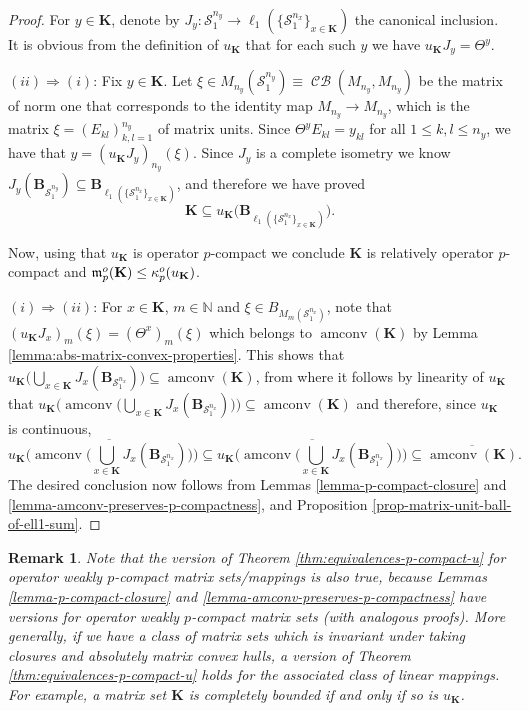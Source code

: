 \documentclass[11pt]{amsart}
\DeclareMathOperator{\CB}{\mathcal{CB}}
\DeclareMathOperator{\amconv}{amconv}
\newcommand{\N}{{\mathbb{N}}}
\newtheorem{remark}[theorem]{Remark}
\numberwithin{equation}{section}
\begin{document}
\begin{proof}
For $y\in \mathbf{K}$, denote by $J_y : \mathcal{S}_1^{n_y} \to \ell_1( \{ \mathcal{S}^{n_x}_1 \}_{x \in \mathbf{K}}) $ the canonical inclusion. It is obvious from the definition of $u_{\mathbf{K}}$ that for each such $y$ we have $u_{\mathbf{K}}J_y = \Theta^y$.

$(ii) \Rightarrow (i)$:
Fix $y\in \mathbf{K}$.
Let $\xi \in M_{n_y}(\mathcal{S}_1^{n_y}) \equiv \CB(M_{n_y},M_{n_y})$ be the matrix of norm one that corresponds to the identity map $M_{n_y} \to M_{n_y}$, which is the matrix $\xi = (E_{kl})_{k,l=1}^{n_y}$ of matrix units.
Since $\Theta^yE_{kl} = y_{kl}$ for all $1 \le k,l \le n_y$, we have that $y = (u_{\mathbf{K}}J_y)_{n_y}(\xi)$.
Since $J_y$ is a complete isometry we know $J_y(\mathbf{B}_{\mathcal{S}_1^{n_y}}) \subseteq \mathbf{B}_{\ell_1( \{ \mathcal{S}^{n_x}_1 \}_{x \in \mathbf{K}}) }$, and therefore we have proved
$$
\mathbf{K} \subseteq u_{\mathbf{K}}\big( \mathbf{B}_{\ell_1( \{ \mathcal{S}^{n_x}_1 \}_{x \in \mathbf{K}}) } \big).
$$

Now, using that $u_{\mathbf{K}}$ is operator $p$-compact we conclude $\mathbf{K}$ is relatively operator $p$-compact and $\frak m_p^o(\mathbf{K}) \le \kappa_p^o(u_\mathbf{K})$.

$(i) \Rightarrow (ii)$:
For $x\in \mathbf{K}$, $m\in\N$ and $\xi \in B_{M_m(\mathcal{S}_1^{n_x})}$, note that $(u_{\mathbf{K}}J_x)_m(\xi) = (\Theta^x)_m(\xi)$
which belongs to $\amconv(\mathbf{K})$ by Lemma \ref{lemma:abs-matrix-convex-properties}.
This shows that $u_{\mathbf{K}} \Big( \bigcup_{x\in \mathbf{K}} J_x(\mathbf{B}_{\mathcal{S}_1^{n_x}}) \Big) \subseteq \amconv(\mathbf{K})$, from where it follows by linearity of $u_{\mathbf{K}}$ that
$u_{\mathbf{K}} \big( \amconv \Big( \bigcup_{x\in \mathbf{K}} J_x(\mathbf{B}_{\mathcal{S}_1^{n_x}}) \Big) \Big)\subseteq \amconv(\mathbf{K})$ and therefore, since $u_\mathbf{K}$ is continuous,
\[
u_{\mathbf{K}} \Big( \overline{\amconv \Big( \bigcup_{x\in \mathbf{K}} J_x(\mathbf{B}_{\mathcal{S}_1^{n_x}})} \Big) \Big) \subseteq
\overline{u_{\mathbf{K}} \Big( \amconv \Big( \bigcup_{x\in \mathbf{K}} J_x(\mathbf{B}_{\mathcal{S}_1^{n_x}}) \Big) \Big)}\subseteq \overline{\amconv(\mathbf{K})}.
\]
The desired conclusion now follows from Lemmas \ref{lemma-p-compact-closure} and 
 \ref{lemma-amconv-preserves-p-compactness},
and Proposition \ref{prop-matrix-unit-ball-of-ell1-sum}.
\end{proof}


\begin{remark} 
Note that the version of Theorem \ref{thm:equivalences-p-compact-u} for operator weakly $p$-compact matrix sets/mappings is also true, because Lemmas \ref{lemma-p-compact-closure} and 
 \ref{lemma-amconv-preserves-p-compactness} have versions for  operator weakly $p$-compact matrix sets (with analogous proofs).
More generally, if we have a class of matrix sets which is invariant under taking closures and absolutely matrix convex hulls, a version of Theorem \ref{thm:equivalences-p-compact-u} holds for the associated class of linear mappings. For example, a matrix set $\mathbf{K}$ is completely bounded if and only if so is $u_{\mathbf{K}}$.
\end{remark}
\end{document}
